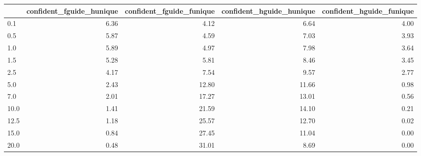 \begin{tabular}{lrrrr}
\toprule
 & confident_fguide_hunique & confident_fguide_funique & confident_hguide_hunique & confident_hguide_funique \\
\midrule
0.1 & 6.36 & 4.12 & 6.64 & 4.00 \\
0.5 & 5.87 & 4.59 & 7.03 & 3.93 \\
1.0 & 5.89 & 4.97 & 7.98 & 3.64 \\
1.5 & 5.28 & 5.81 & 8.46 & 3.45 \\
2.5 & 4.17 & 7.54 & 9.57 & 2.77 \\
5.0 & 2.43 & 12.80 & 11.66 & 0.98 \\
7.0 & 2.01 & 17.27 & 13.01 & 0.56 \\
10.0 & 1.41 & 21.59 & 14.10 & 0.21 \\
12.5 & 1.18 & 25.57 & 12.70 & 0.02 \\
15.0 & 0.84 & 27.45 & 11.04 & 0.00 \\
20.0 & 0.48 & 31.01 & 8.69 & 0.00 \\
\bottomrule
\end{tabular}
